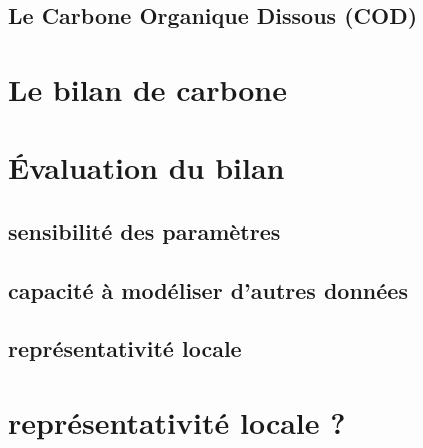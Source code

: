 \subsection{Le Carbone Organique Dissous (COD)}

\section{Le bilan de carbone}

\section{Évaluation du bilan}

\subsection{sensibilité des paramètres}

\subsection{capacité à modéliser d'autres données}

\subsection{représentativité locale}

\section{représentativité locale ?}